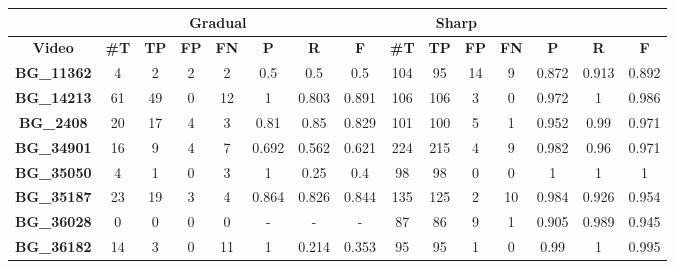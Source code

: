 \documentclass[journal]{IEEEtran}
\begin{document}
\begin{table*}[h]
\centering

\begin{tabular}{|c|c|c|c|c|c|c|c|c|c|c|c|c|c|c|}
\hline
 & \multicolumn{6}{c|}{\textbf{Gradual}} & \multicolumn{6}{c|}{\textbf{Sharp}}  \\ \hline
\textbf{Video} & \textbf{\#T} & \textbf{TP} & \textbf{FP} & \textbf{FN} & \textbf{P} & \textbf{R} & \textbf{F} & \textbf{\#T} & \textbf{TP} & \textbf{FP} & \textbf{FN} & \textbf{P} & \textbf{R} & \textbf{F} \\ \hline
\textbf{BG\_11362} & 4             & 2           & 2           & 2           & 0.5        & 0.5        & 0.5        & 104           & 95          & 14          & 9           & 0.872      & 0.913      & 0.892      \\ \hline
\textbf{BG\_14213} & 61            & 49          & 0           & 12          & 1          & 0.803      & 0.891      & 106           & 106         & 3           & 0           & 0.972      & 1          & 0.986      \\ \hline
\textbf{BG\_2408}  & 20            & 17          & 4           & 3           & 0.81       & 0.85       & 0.829      & 101           & 100         & 5           & 1           & 0.952      & 0.99       & 0.971      \\ \hline
\textbf{BG\_34901} & 16            & 9           & 4           & 7           & 0.692      & 0.562      & 0.621      & 224           & 215         & 4           & 9           & 0.982      & 0.96       & 0.971      \\ \hline
\textbf{BG\_35050} & 4             & 1           & 0           & 3           & 1          & 0.25       & 0.4        & 98            & 98          & 0           & 0           & 1          & 1          & 1          \\ \hline
\textbf{BG\_35187} & 23            & 19          & 3           & 4           & 0.864      & 0.826      & 0.844      & 135           & 125         & 2           & 10          & 0.984      & 0.926      & 0.954      \\ \hline
\textbf{BG\_36028} & 0             & 0           & 0           & 0           & -          & -          & -          & 87            & 86          & 9           & 1           & 0.905      & 0.989      & 0.945      \\ \hline
\textbf{BG\_36182} & 14            & 3           & 0           & 11          & 1          & 0.214      & 0.353      & 95            & 95          & 1           & 0           & 0.99       & 1          & 0.995      \\ \hline

\end{tabular}
\end{table*}
\end{document}
